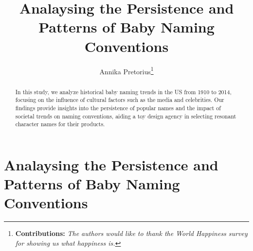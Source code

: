 \documentclass[11pt,preprint, authoryear]{elsarticle}
\numberwithin{equation}{section}
\numberwithin{figure}{section}
\numberwithin{table}{section}
\let\rmarkdownfootnote\footnote%
\def\footnote{\protect\rmarkdownfootnote}
\begin{document}
\begin{frontmatter}  %

\title{Analaysing the Persistence and Patterns of Baby Naming
Conventions}





\author[Add1]{Annika Pretorius\footnote{\textbf{Contributions:}
  \newline \emph{The authors would like to thank the World Happiness
  survey for showing us what happiness is.}}}
\ead{}





\address[Add1]{Stellenbosch University}


\begin{abstract}
\small{
In this study, we analyze historical baby naming trends in the US from
1910 to 2014, focusing on the influence of cultural factors such as the
media and celebrities. Our findings provide insights into the
persistence of popular names and the impact of societal trends on naming
conventions, aiding a toy design agency in selecting resonant character
names for their products.
}
\end{abstract}

\vspace{1cm}





\vspace{0.5cm}

\end{frontmatter}

\setcounter{footnote}{0}



\pagestyle{fancy}
\chead{}
\rhead{}
\lfoot{}
\lhead{}
\cfoot{}


\headsep 35pt %




\newpage

\hypertarget{analaysing-the-persistence-and-patterns-of-baby-naming-conventions}{%
\section{Analaysing the Persistence and Patterns of Baby Naming
Conventions}\label{analaysing-the-persistence-and-patterns-of-baby-naming-conventions}}
\end{document}
